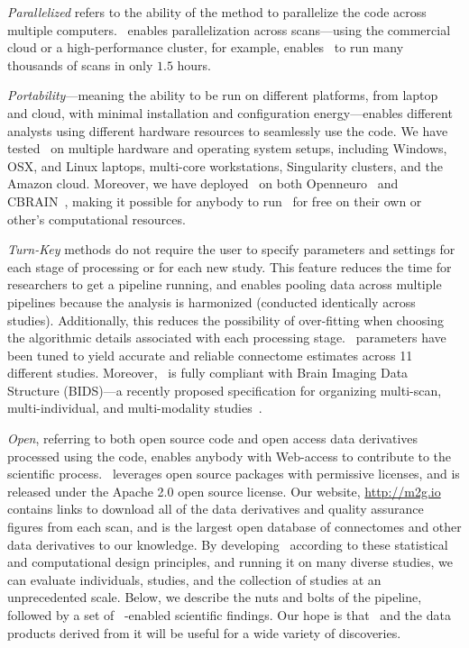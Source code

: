\documentclass[11pt]{article}
\begin{document}
\begin{multicols}{2}
\emph{Parallelized} refers to the ability of the method to parallelize the code across multiple computers.
\ndmg~enables parallelization across scans---using the commercial cloud or a high-performance cluster, for example, enables \ndmg~to run many thousands of scans in only $1.5$ hours.

\emph{Portability}---meaning the ability to be run on different platforms, from laptop and cloud, with minimal installation and configuration energy---enables different analysts using different hardware resources to seamlessly use the code.
We have tested \ndmg~on multiple hardware and operating system setups, including Windows, OSX, and Linux laptops,  multi-core workstations, Singularity clusters, and the Amazon cloud.
Moreover, we have deployed \ndmg~on both Openneuro~\cite{openneuro} and CBRAIN~\cite{CBRAIN}, making it possible for anybody to  run \ndmg~for free on their own or other's computational resources.  

\emph{Turn-Key} methods do not require the user to specify parameters and settings for each stage of processing or for each new study.
This feature reduces the time for researchers to get a pipeline running, and enables pooling data across multiple pipelines because the analysis is harmonized (conducted identically across studies). 
Additionally, this reduces the possibility of over-fitting when choosing the algorithmic details associated with each processing stage.
\ndmg~parameters have been tuned to yield accurate and reliable connectome estimates across 11 different studies.
Moreover, \ndmg~is fully compliant with Brain Imaging Data Structure (BIDS)---a recently proposed specification for organizing multi-scan, multi-individual, and multi-modality studies~\cite{bids, bidsapps}.

\emph{Open}, referring to both open source code and open access data derivatives processed using the code, enables anybody with Web-access to contribute to the scientific process.
\ndmg~leverages open source packages with permissive licenses, and is released under the Apache 2.0 open source license.
Our website, \url{http://m2g.io} contains links to download all of the data derivatives and quality assurance figures from each scan, and is the largest open database of connectomes and other data derivatives to our knowledge.
By developing \ndmg~according to these statistical and computational design principles, and running it on many diverse studies, we can evaluate individuals, studies, and the collection of studies at an unprecedented scale.
Below, we describe the nuts and bolts of the pipeline, followed by a set of \ndmg~-enabled scientific findings.
Our hope is that \ndmg~and the data products derived from it will be useful for a wide variety of discoveries.


\end{multicols}
\end{document}
